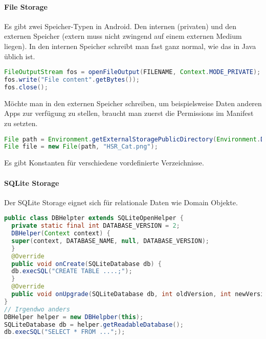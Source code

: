 \paragraph{File Storage} Es gibt zwei Speicher-Typen in Android. Den internen (privaten) und den externen Speicher (extern muss nicht zwingend auf einem externen Medium liegen). In den internen Speicher schreibt man fast ganz normal, wie das in Java üblich ist.
\begin{lstlisting}[language=java]
FileOutputStream fos = openFileOutput(FILENAME, Context.MODE_PRIVATE);
fos.write("File content".getBytes());
fos.close();
\end{lstlisting}
Möchte man in den externen Speicher schreiben, um beispielsweise Daten anderen Apps zur verfügung zu stellen, braucht man zuerst die Permissions im Manifest zu setzten. 
\begin{lstlisting}[language=java]
File path = Environment.getExternalStoragePublicDirectory(Environment.DIRECTORY_PICTURES);
File file = new File(path, "HSR_Cat.png");
\end{lstlisting}
Es gibt Konstanten für verschiedene vordefinierte Verzeichnisse.
\paragraph{SQLite Storage} Der SQLite Storage eignet sich für relationale Daten wie Domain Objekte.
\begin{lstlisting}[language=java]
public class DBHelpter extends SQLiteOpenHelper {
  private static final int DATABASE_VERSION = 2;
  DBHelper(Context context) {
  super(context, DATABASE_NAME, null, DATABASE_VERSION);
  }
  @Override
  public void onCreate(SQLiteDatabase db) {
  db.execSQL("CREATE TABLE ....;");
  }
  @Override
  public void onUpgrade(SQLiteDatabase db, int oldVersion, int newVersion {}
}
// Irgendwo anders
DBHelper helper = new DBHelpber(this);
SQLiteDatabase db = helper.getReadableDatabase();
db.execSQL("SELECT * FROM ...";);
\end{lstlisting}

